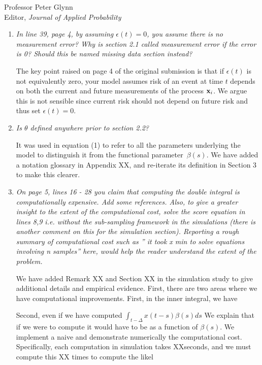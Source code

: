 \documentclass[11pt]{letter} %
\begin{document}
\begin{letter}{Professor
	Peter Glynn\\
	Editor, {\em Journal of Applied Probability}}
\begin{enumerate}
\item {\it In line 39, page 4, by assuming $\epsilon(t) = 0$, you assume there is no measurement error? Why is section 2.1 called measurement error if the error is 0? Should this be named missing data section instead?}

\vspace{5mm}
The key point raised on page 4 of the original submission is that if $\epsilon(t)$ is not equivalently zero, your model assumes risk of an event at time $t$ depends on both the current and future measurements of the process ${\bf x}_i$. We argue this is not sensible since current risk should not depend on future risk and thus set $\epsilon(t) = 0$.
\vspace{5mm}

\item  {\it Is $\theta$ defined anywhere prior to section 2.2?}

\vspace{5mm}
It was used in equation (1) to refer to all the parameters underlying the model to distinguish it from the functional parameter~$\beta (s)$. We have added a notation glossary in Appendix XX, and re-iterate its definition in Section 3 to make this clearer.
\vspace{5mm}

\item {\it On page 5, lines 16 - 28 you claim that computing the double integral is computationally expensive. Add some references. Also, to give a greater insight to the extent of the computational cost, solve the score equation in lines 8,9 i.e. without the sub-sampling framework in the simulations (there is another comment on this for the simulation section). Reporting a rough summary of computational cost such as ” it took x min to solve equations involving n samples” here, would help the reader understand
the extent of the problem.}

\vspace{5mm}
We have added Remark XX and Section XX in the simulation study to give additional details and empirical evidence. First, there are two areas where we have computational improvements.  First, in the inner integral, we have

Second, even if we have computed $\int_{t-\Delta} x(t-s)\beta(s) ds$
We explain that if we were to compute it would have to be as a function of $\beta(s)$.  We implement a naive and demonstrate numerically the computational cost.  Specifically, each computation in simulation takes XXseconds, and we must compute this XX times to compute the likel
\vspace{5mm}


\end{enumerate}
\end{letter}
\end{document}
